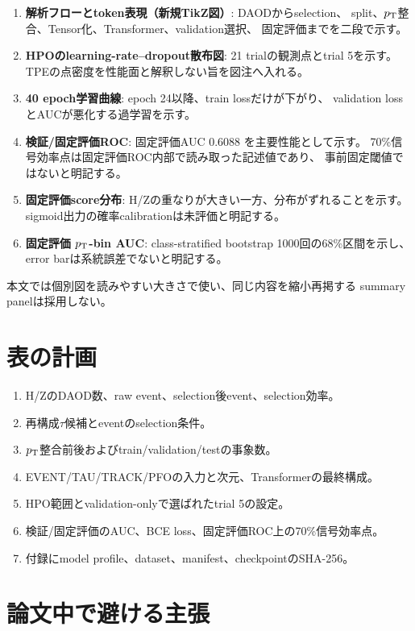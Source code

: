 \documentclass[xelatex,ja=standard,a4paper,10pt]{bxjsarticle}
\begin{document}
\begin{enumerate}
  \item \textbf{解析フローとtoken表現（新規TikZ図）}: DAODからselection、
    split、\(p_{\mathrm{T}}\)整合、Tensor化、Transformer、validation選択、
    固定評価までを二段で示す。
  \item \textbf{HPOのlearning-rate--dropout散布図}: 21 trialの観測点とtrial 5を示す。
    TPEの点密度を性能面と解釈しない旨を図注へ入れる。
  \item \textbf{40 epoch学習曲線}: epoch 24以降、train lossだけが下がり、
    validation lossとAUCが悪化する過学習を示す。
  \item \textbf{検証/固定評価ROC}: 固定評価AUC \(0.6088\) を主要性能として示す。
    70\%信号効率点は固定評価ROC内部で読み取った記述値であり、
    事前固定閾値ではないと明記する。
  \item \textbf{固定評価score分布}: H/Zの重なりが大きい一方、分布がずれることを示す。
    sigmoid出力の確率calibrationは未評価と明記する。
  \item \textbf{固定評価 \(p_{\mathrm{T}}\)-bin AUC}: class-stratified bootstrap 1000回の68\%区間を示し、
    error barは系統誤差でないと明記する。
\end{enumerate}

本文では個別図を読みやすい大きさで使い、同じ内容を縮小再掲する
summary panelは採用しない。

\section{表の計画}

\begin{enumerate}
  \item H/ZのDAOD数、raw event、selection後event、selection効率。
  \item 再構成\(\tau\)候補とeventのselection条件。
  \item \(p_{\mathrm{T}}\)整合前後およびtrain/validation/testの事象数。
  \item EVENT/TAU/TRACK/PFOの入力と次元、Transformerの最終構成。
  \item HPO範囲とvalidation-onlyで選ばれたtrial 5の設定。
  \item 検証/固定評価のAUC、BCE loss、固定評価ROC上の70\%信号効率点。
  \item 付録にmodel profile、dataset、manifest、checkpointのSHA-256。
\end{enumerate}

\section{論文中で避ける主張}
\end{document}
